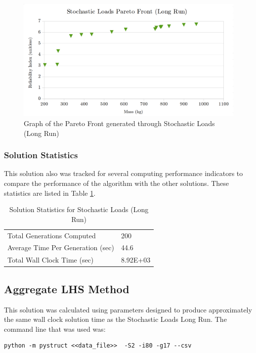 \begin{figure}
\includegraphics[width=\textwidth]{img/pf_sto_long.png}
	\caption{Graph of the Pareto Front generated through Stochastic Loads (Long Run)}
\label{fig:pfront_sto_long}
\end{figure}

\subsubsection{Solution Statistics}
This solution also was tracked for several computing performance indicators to compare the performance of the algorithm with the other solutions. These statistics are listed in Table \ref{tab:stat_sto_long}. 

\begin{table}[!htbp]
  \caption{Solution Statistics for Stochastic Loads (Long Run)}
  \label{tab:stat_sto_long}
  \centering
  \begin{tabular}{|l|l|}
    \hline
	  Total Generations Computed & 200\\
    Average Time Per Generation (sec) & 44.6\\
    Total Wall Clock Time (sec)	 & 8.92E+03\\
    \hline
  \end{tabular}
\end{table}




\subsection{Aggregate LHS Method}
This solution was calculated using parameters designed to produce approximately the same wall clock solution time as the Stochastic Loads Long Run. The command line that was used was:

\begin{verbatim}
python -m pystruct <<data_file>>  -S2 -i80 -g17 --csv
\end{verbatim}

